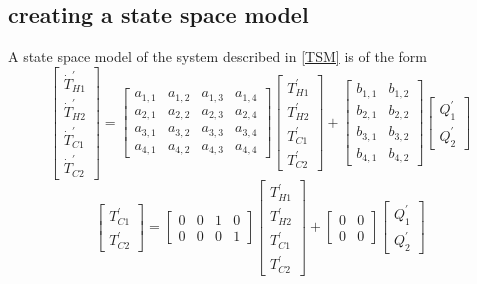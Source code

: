 \subsection{creating a state space model}

A state space model of the system described in \ref{TSM} is of the form
$$
\left[\begin{array}{l}
\dot{T}_{H 1}^{\prime} \\
\dot{T}_{H 2}^{\prime} \\
\dot{T}_{C 1}^{\prime} \\
\dot{T}_{C 2}^{\prime}
\end{array}\right]=\left[\begin{array}{llll}
a_{1,1} & a_{1,2} & a_{1,3} & a_{1,4} \\
a_{2,1} & a_{2,2} & a_{2,3} & a_{2,4} \\
a_{3,1} & a_{3,2} & a_{3,3} & a_{3,4} \\
a_{4,1} & a_{4,2} & a_{4,3} & a_{4,4}
\end{array}\right]\left[\begin{array}{l}
T_{H 1}^{\prime} \\
T_{H 2}^{\prime} \\
T_{C 1}^{\prime} \\
T_{C 2}^{\prime}
\end{array}\right]+\left[\begin{array}{ll}
b_{1,1} & b_{1,2} \\
b_{2,1} & b_{2,2} \\
b_{3,1} & b_{3,2} \\
b_{4,1} & b_{4,2}
\end{array}\right]\left[\begin{array}{l}
Q_{1}^{\prime} \\
Q_{2}^{\prime}
\end{array}\right]
$$
$$
\left[\begin{array}{l}
T_{C 1}^{\prime} \\
T_{C 2}^{\prime}
\end{array}\right]=\left[\begin{array}{llll}
0 & 0 & 1 & 0 \\
0 & 0 & 0 & 1
\end{array}\right]\left[\begin{array}{l}
T_{H 1}^{\prime} \\
T_{H 2}^{\prime} \\
T_{C 1}^{\prime} \\
T_{C 2}^{\prime}
\end{array}\right]+\left[\begin{array}{ll}
0 & 0 \\
0 & 0
\end{array}\right]\left[\begin{array}{l}
Q_{1}^{\prime} \\
Q_{2}^{\prime}
\end{array}\right]
$$

